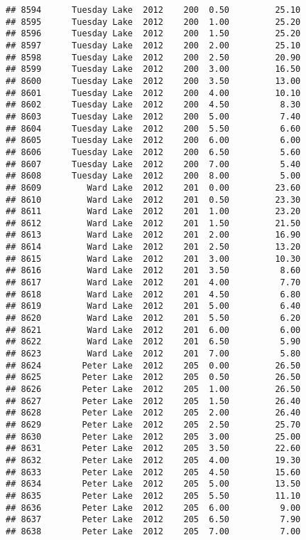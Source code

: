 \documentclass[
]{article}
\begin{document}
\begin{verbatim}
## 8594      Tuesday Lake  2012    200  0.50         25.10
## 8595      Tuesday Lake  2012    200  1.00         25.20
## 8596      Tuesday Lake  2012    200  1.50         25.20
## 8597      Tuesday Lake  2012    200  2.00         25.10
## 8598      Tuesday Lake  2012    200  2.50         20.90
## 8599      Tuesday Lake  2012    200  3.00         16.50
## 8600      Tuesday Lake  2012    200  3.50         13.00
## 8601      Tuesday Lake  2012    200  4.00         10.10
## 8602      Tuesday Lake  2012    200  4.50          8.30
## 8603      Tuesday Lake  2012    200  5.00          7.40
## 8604      Tuesday Lake  2012    200  5.50          6.60
## 8605      Tuesday Lake  2012    200  6.00          6.00
## 8606      Tuesday Lake  2012    200  6.50          5.60
## 8607      Tuesday Lake  2012    200  7.00          5.40
## 8608      Tuesday Lake  2012    200  8.00          5.00
## 8609         Ward Lake  2012    201  0.00         23.60
## 8610         Ward Lake  2012    201  0.50         23.30
## 8611         Ward Lake  2012    201  1.00         23.20
## 8612         Ward Lake  2012    201  1.50         21.50
## 8613         Ward Lake  2012    201  2.00         16.90
## 8614         Ward Lake  2012    201  2.50         13.20
## 8615         Ward Lake  2012    201  3.00         10.30
## 8616         Ward Lake  2012    201  3.50          8.60
## 8617         Ward Lake  2012    201  4.00          7.70
## 8618         Ward Lake  2012    201  4.50          6.80
## 8619         Ward Lake  2012    201  5.00          6.40
## 8620         Ward Lake  2012    201  5.50          6.20
## 8621         Ward Lake  2012    201  6.00          6.00
## 8622         Ward Lake  2012    201  6.50          5.90
## 8623         Ward Lake  2012    201  7.00          5.80
## 8624        Peter Lake  2012    205  0.00         26.50
## 8625        Peter Lake  2012    205  0.50         26.50
## 8626        Peter Lake  2012    205  1.00         26.50
## 8627        Peter Lake  2012    205  1.50         26.40
## 8628        Peter Lake  2012    205  2.00         26.40
## 8629        Peter Lake  2012    205  2.50         25.70
## 8630        Peter Lake  2012    205  3.00         25.00
## 8631        Peter Lake  2012    205  3.50         22.60
## 8632        Peter Lake  2012    205  4.00         19.30
## 8633        Peter Lake  2012    205  4.50         15.60
## 8634        Peter Lake  2012    205  5.00         13.50
## 8635        Peter Lake  2012    205  5.50         11.10
## 8636        Peter Lake  2012    205  6.00          9.00
## 8637        Peter Lake  2012    205  6.50          7.90
## 8638        Peter Lake  2012    205  7.00          7.00

\end{verbatim}
\end{document}

